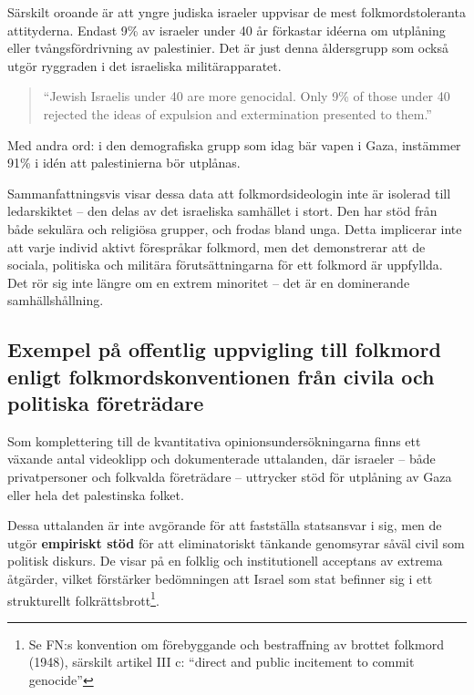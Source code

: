 Särskilt oroande är att yngre judiska israeler uppvisar de mest folkmordstoleranta attityderna. Endast 9\% av israeler under 40 år förkastar idéerna om utplåning eller tvångsfördrivning av palestinier. Det är just denna åldersgrupp som också utgör ryggraden i det israeliska militärapparatet.

\begin{quote}
“Jewish Israelis under 40 are more genocidal. Only 9\% of those under 40 rejected the ideas of expulsion and extermination presented to them.”
\end{quote}

Med andra ord: i den demografiska grupp som idag bär vapen i Gaza, instämmer 91\% i idén att palestinierna bör utplånas.

Sammanfattningsvis visar dessa data att folkmordsideologin inte är isolerad till ledarskiktet – den delas av det israeliska samhället i stort. Den har stöd från både sekulära och religiösa grupper, och frodas bland unga. Detta implicerar inte att varje individ aktivt förespråkar folkmord, men det demonstrerar att de sociala, politiska och militära förutsättningarna för ett folkmord är uppfyllda. Det rör sig inte längre om en extrem minoritet – det är en dominerande samhällshållning.





\subsection{Exempel på offentlig uppvigling till folkmord enligt folkmordskonventionen från civila och politiska företrädare}

Som komplettering till de kvantitativa opinionsundersökningarna finns ett växande antal videoklipp och dokumenterade uttalanden, där israeler – både privatpersoner och folkvalda företrädare – uttrycker stöd för utplåning av Gaza eller hela det palestinska folket.

Dessa uttalanden är inte avgörande för att fastställa statsansvar i sig, men de utgör \textbf{empiriskt stöd} för att eliminatoriskt tänkande genomsyrar såväl civil som politisk diskurs. De visar på en folklig och institutionell acceptans av extrema åtgärder, vilket förstärker bedömningen att Israel som stat befinner sig i ett strukturellt folkrättsbrott\footnote{Se FN:s konvention om förebyggande och bestraffning av brottet folkmord (1948), särskilt artikel III c: “direct and public incitement to commit genocide”}.

